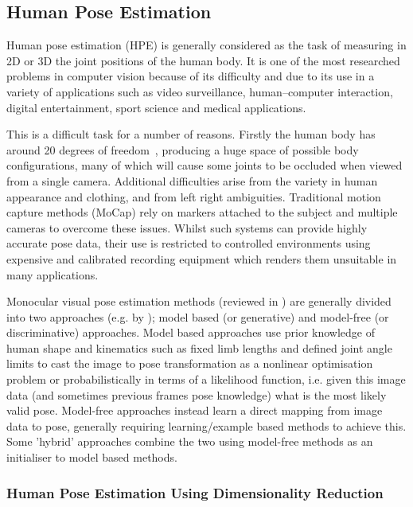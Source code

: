 \documentclass[11pt]{article} %
\begin{document}
\subsection{Human Pose Estimation}

Human pose estimation (HPE) is generally considered as the task of measuring in 2D or 3D the joint positions of the human body. It is one of the most researched problems in computer vision because of its difficulty and due to its use in a variety of applications such as video surveillance, human–computer interaction, digital entertainment, sport science and medical applications.

This is a difficult task for a number of reasons. Firstly the human body has around 20 degrees of freedom~\cite{Forsyth2005}, producing a huge space of possible body configurations, many of which will cause some joints to be occluded when viewed from a single camera. Additional difficulties arise from the variety in human appearance and clothing, and from left right ambiguities. Traditional motion capture methods (MoCap) rely on markers attached to the subject and multiple cameras to overcome these issues. Whilst such systems can provide highly accurate pose data, their use is restricted to controlled environments using expensive and calibrated recording equipment which renders them unsuitable in many applications.

Monocular visual pose estimation methods (reviewed in \cite{Moeslund2006, Hen2009,Poppe2007,Sminchisescu2006,Liu2015}) are generally divided into two approaches (e.g. by \cite{Poppe2007}); model based (or generative) and model-free (or discriminative) approaches. Model based approaches use prior knowledge of human shape and kinematics such as fixed limb lengths and defined joint angle limits to cast the image to pose transformation as a nonlinear optimisation problem or probabilistically in terms of a likelihood function, i.e. given this image data (and sometimes previous frames pose knowledge) what is the most likely valid pose. Model-free approaches instead learn a direct mapping from image data to pose, generally requiring learning/example based methods to achieve this. Some 'hybrid' approaches combine the two using model-free methods as an initialiser to model based methods. 


\subsubsection{Human Pose Estimation Using Dimensionality Reduction}
\end{document}
